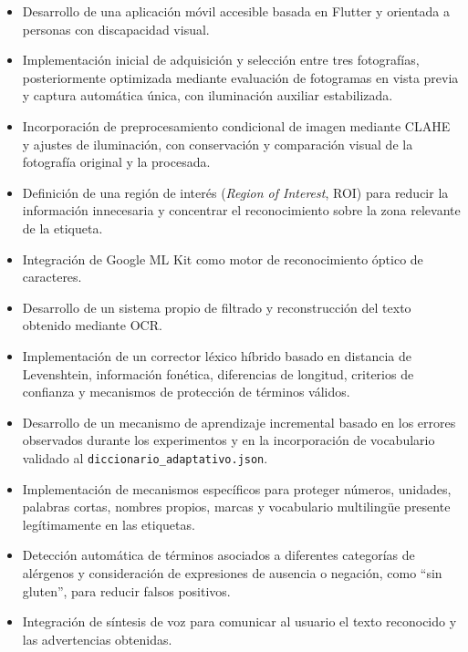 \begin{itemize}[noitemsep]
	
	\item Desarrollo de una aplicación móvil accesible basada en Flutter y orientada a personas con discapacidad visual.
	
	\item Implementación inicial de adquisición y selección entre tres fotografías, posteriormente optimizada mediante evaluación de fotogramas en vista previa y captura automática única, con iluminación auxiliar estabilizada.
	
	\item Incorporación de preprocesamiento condicional de imagen mediante CLAHE y ajustes de iluminación, con conservación y comparación visual de la fotografía original y la procesada.

\item Definición de una región de interés (\textit{Region of Interest}, ROI) para reducir la información innecesaria y concentrar el reconocimiento sobre la zona relevante de la etiqueta.
	
	\item Integración de Google ML Kit como motor de reconocimiento óptico de caracteres.
	
	\item Desarrollo de un sistema propio de filtrado y reconstrucción del texto obtenido mediante OCR.
	
	\item Implementación de un corrector léxico híbrido basado en distancia de Levenshtein, información fonética, diferencias de longitud, criterios de confianza y mecanismos de protección de términos válidos.
	
	\item Desarrollo de un mecanismo de aprendizaje incremental basado en los errores observados durante los experimentos y en la incorporación de vocabulario validado al \texttt{diccionario\_adaptativo.json}.
	
	\item Implementación de mecanismos específicos para proteger números, unidades, palabras cortas, nombres propios, marcas y vocabulario multilingüe presente legítimamente en las etiquetas.
	
	\item Detección automática de términos asociados a diferentes categorías de alérgenos y consideración de expresiones de ausencia o negación, como ``sin gluten'', para reducir falsos positivos.
	
	\item Integración de síntesis de voz para comunicar al usuario el texto reconocido y las advertencias obtenidas.
	
\end{itemize}
	


